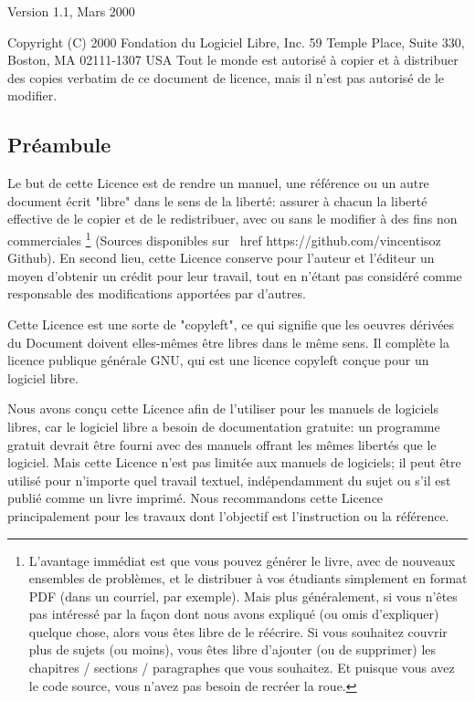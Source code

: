 	\begin{center}
	Version 1.1, Mars 2000
		
	Copyright (C) 2000 Fondation du Logiciel Libre, Inc. 59 Temple Place, Suite 330, Boston, MA 02111-1307 USA Tout le monde est autorisé à copier et à distribuer des copies verbatim de ce document de licence, mais il n'est pas autorisé de le modifier. 
	\end{center}

	\subsection{Préambule} 
	Le but de cette Licence est de rendre un manuel, une référence ou un autre document écrit "libre" dans le sens de la liberté: assurer à chacun la liberté effective de le copier et de le redistribuer, avec ou sans le modifier à des fins non commerciales \footnote{L'avantage immédiat est que vous pouvez générer le livre, avec de nouveaux ensembles de problèmes, et le distribuer à vos étudiants simplement en format PDF (dans un courriel, par exemple). Mais plus généralement, si vous n'êtes pas intéressé par la façon dont nous avons expliqué (ou omis d'expliquer) quelque chose, alors vous êtes libre de le réécrire. Si vous souhaitez couvrir plus de sujets (ou moins), vous êtes libre d'ajouter (ou de supprimer) les chapitres / sections / paragraphes que vous souhaitez. Et puisque vous avez le code source, vous n'avez pas besoin de recréer la roue.} (Sources disponibles sur \ href {https://github.com/vincentisoz} {Github}). En second lieu, cette Licence conserve pour l'auteur et l'éditeur un moyen d'obtenir un crédit pour leur travail, tout en n'étant pas considéré comme responsable des modifications apportées par d'autres.

	Cette Licence est une sorte de "copyleft", ce qui signifie que les oeuvres dérivées du Document doivent elles-mêmes être libres dans le même sens. Il complète la licence publique générale GNU, qui est une licence copyleft conçue pour un logiciel libre.

	Nous avons conçu cette Licence afin de l'utiliser pour les manuels de logiciels libres, car le logiciel libre a besoin de documentation gratuite: un programme gratuit devrait être fourni avec des manuels offrant les mêmes libertés que le logiciel. Mais cette Licence n'est pas limitée aux manuels de logiciels; il peut être utilisé pour n'importe quel travail textuel, indépendamment du sujet ou s'il est publié comme un livre imprimé. Nous recommandons cette Licence principalement pour les travaux dont l'objectif est l'instruction ou la référence.

